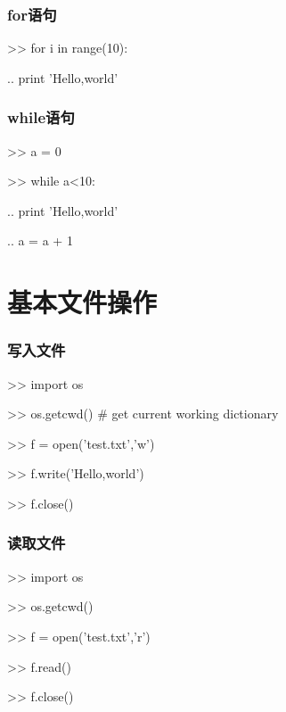 \documentclass[13pt]{beamer}
\begin{document}
\begin{frame}
\frametitle{for语句}
\begin{python}

>> for i in range(10):

..    print 'Hello,world'

\end{python}
\end{frame}

\begin{frame}
\frametitle{while语句}
\begin{python}

>> a = 0

>> while a<10:

..    print 'Hello,world'

..    a = a + 1

\end{python}
\end{frame}

\section{基本文件操作}

\begin{frame}
\frametitle{写入文件}

\begin{python}

>> import os

>> os.getcwd()  \# get current working dictionary

>> f = open('test.txt','w')

>> f.write('Hello,world')

>> f.close()

\end{python}

\end{frame}

\begin{frame}
\frametitle{读取文件}

\begin{python}

>> import os

>> os.getcwd()

>> f = open('test.txt','r')

>> f.read()

>> f.close()

\end{python}

\end{frame}
\end{document}
